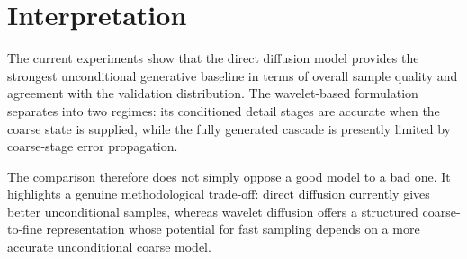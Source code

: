 \section{Interpretation}

The current experiments show that the direct diffusion model provides the
strongest unconditional generative baseline in terms of overall sample quality
and agreement with the validation distribution. The wavelet-based formulation
separates into two regimes: its conditioned detail stages are accurate when the
coarse state is supplied, while the fully generated cascade is presently
limited by coarse-stage error propagation.

The comparison therefore does not simply oppose a good model to a bad one. It
highlights a genuine methodological trade-off: direct diffusion currently gives
better unconditional samples, whereas wavelet diffusion offers a structured
coarse-to-fine representation whose potential for fast sampling depends on a
more accurate unconditional coarse model.

